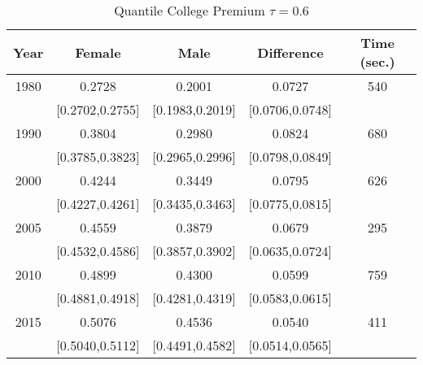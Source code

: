 \begin{table}[ht]
\centering
\begin{tabular}{ccccc}
  \hline
Year & Female & Male & Difference & Time (sec.) \\ 
  \hline
1980 & 0.2728 & 0.2001 & 0.0727 & 540 \\ 
   & [0.2702,0.2755] & [0.1983,0.2019] & [0.0706,0.0748] &  \\ 
  1990 & 0.3804 & 0.2980 & 0.0824 & 680 \\ 
   & [0.3785,0.3823] & [0.2965,0.2996] & [0.0798,0.0849] &  \\ 
  2000 & 0.4244 & 0.3449 & 0.0795 & 626 \\ 
   & [0.4227,0.4261] & [0.3435,0.3463] & [0.0775,0.0815] &  \\ 
  2005 & 0.4559 & 0.3879 & 0.0679 & 295 \\ 
   & [0.4532,0.4586] & [0.3857,0.3902] & [0.0635,0.0724] &  \\ 
  2010 & 0.4899 & 0.4300 & 0.0599 & 759 \\ 
   & [0.4881,0.4918] & [0.4281,0.4319] & [0.0583,0.0615] &  \\ 
  2015 & 0.5076 & 0.4536 & 0.0540 & 411 \\ 
   & [0.5040,0.5112] & [0.4491,0.4582] & [0.0514,0.0565] &  \\ 
   \hline
\end{tabular}
\caption{Quantile College Premium $\tau=0.6$} 
\end{table}
